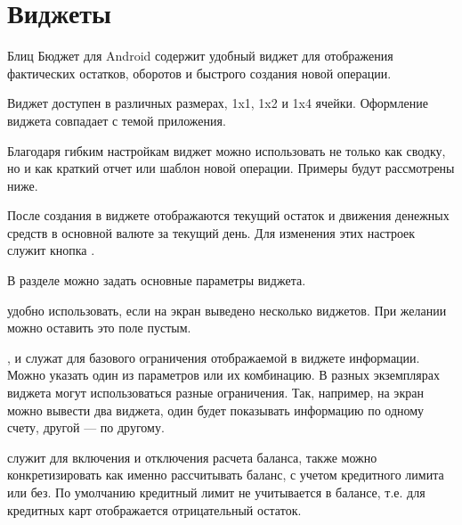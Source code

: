 \documentclass[a4paper,10pt,russian]{sphinxmanual}
\begin{document}
\section{Виджеты}
\label{\detokenize{widgets:id2}}
\sphinxAtStartPar
Блиц Бюджет для Android содержит удобный виджет для отображения фактических остатков, оборотов и быстрого создания новой операции.


\sphinxAtStartPar
Виджет доступен в различных размерах, 1x1, 1x2 и 1x4 ячейки. Оформление виджета совпадает с темой приложения.

\sphinxAtStartPar
Благодаря гибким настройкам виджет можно использовать не только как сводку, но и как краткий отчет или шаблон
новой операции. Примеры будут рассмотрены ниже.

\noindent{}

\noindent{}

\noindent{}

\sphinxAtStartPar
После создания в виджете отображаются текущий остаток и движения денежных средств в основной валюте за текущий день.
Для изменения этих настроек служит кнопка .

\sphinxAtStartPar
В разделе  можно задать основные параметры виджета.

\sphinxAtStartPar
{} удобно использовать, если на экран выведено несколько виджетов. При желании можно оставить это поле
пустым.

\sphinxAtStartPar
{},  и  служат для базового ограничения отображаемой в
виджете информации. Можно указать один из параметров или их комбинацию. В разных экземплярах виджета могут использоваться
разные ограничения. Так, например, на экран можно вывести два виджета, один будет показывать информацию по одному счету,
другой — по другому.

\sphinxAtStartPar
{}  служит для включения и отключения расчета баланса, также можно конкретизировать как именно
рассчитывать баланс, с учетом кредитного лимита или без. По умолчанию кредитный лимит не учитывается в балансе, т.е. для
кредитных карт отображается отрицательный остаток.
\end{document}
